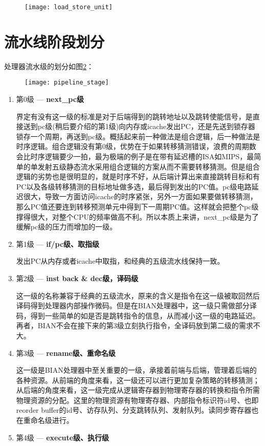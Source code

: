 \begin{figure}[!htbp]
	\centering
	\texttt{[image: load\_store\_unit]}
	\label{fig:ls_unit}
\end{figure}

\section{流水线阶段划分}

处理器流水级的划分如图\ref{fig:my_pipeline}：
\begin{figure}[!htbp]
	\texttt{[image: pipeline\_stage]}
	\label{fig:my_pipeline}
\end{figure}
\begin{enumerate}[label=(\alph*)]
	\item 第0级 --- \textbf{next\_pc级}
	
	界定有没有这一级的标准是对于后端得到的跳转地址以及跳转使能信号，是直接送到pc级(稍后要介绍的第1级)向内存或icache发出PC，还是先送到锁存器锁存一个周期，再送到pc级。概括起来前一种做法是组合逻辑，后一种做法是时序逻辑。组合逻辑没有第0级，优势在于如果转移猜测错误，浪费的周期数会比时序逻辑要少一拍，最为极端的例子是在带有延迟槽的ISA如MIPS，最简单的单发射五级静态流水采用组合逻辑的方案从而不需要转移猜测。但是组合逻辑的劣势也是很明显的，就是时序不好，从后端计算出来直接跳转目标和有PC以及各级转移猜测的目标地址做多选，最后得到发出的PC值。pc级电路延迟很大，导致一方面访问icache的时序紧张，另外一方面如果要做转移猜测，那么PC值还要连到转移预测单元中得到下一周期PC值。这样就会把整个pc级撑得很大，对整个CPU的频率做高不利。所以本质上来讲，next\_pc级是为了缓解pc级的压力而增加的一级。
	\item 第1级 --- \textbf{if/pc级、取指级}
	
	发出PC从内存或者icache中取指，和经典的五级流水线保持一致。
	\item 第2级 --- \textbf{inst back \& dec级，译码级}
	
	这一级的名称兼容于经典的五级流水，原来的含义是指令在这一级被取回然后译码得到处理器内部操作微码。但是在BIAN处理器中，这一级只需做部分译码，得到一些简单的如是否是跳转指令的信息，从而减小这一级的电路延迟。再者，BIAN不会在接下来的第3级立刻执行指令，全译码放到第二级的需求不大。
	\item 第3级 --- \textbf{rename级、重命名级}
	
	这一级是BIAN处理器中至关重要的一级，承接着前端与后端，管理着后端的各种资源。从前端的角度来看，这一级还可以进行更加复杂策略的转移猜测；从后端的角度来看，这一级完成从逻辑寄存器到物理寄存器的转换和指令所需物理资源的分配。这里的物理资源有物理寄存器、内部指令标识符id号、也即reorder buffer的id号、访存队列、分支跳转队列、发射队列。读同步寄存器也在重命名级进行。
	\item 第4级 --- \textbf{execute级、执行级}
	

\end{enumerate}
